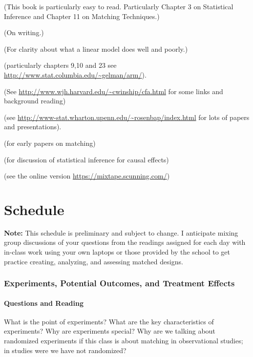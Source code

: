 \documentclass[10pt,letterpaper]{article}
\newenvironment{introstuff} {\setcounter{secnumdepth}{0}%
} {\setcounter{secnumdepth}{1}%
\restoregeometry
}
\begin{document}
\begin{introstuff}
   (This book is particularly easy to read. Particularly Chapter 3 on Statistical Inference and Chapter 11 on Matching Techniques.)

   (On writing.)


   (For clarity about what a linear model does well and poorly.)

    (particularly chapters 9,10 and 23 see \url{http://www.stat.columbia.edu/~gelman/arm/}).

   (See \url{http://www.wjh.harvard.edu/~cwinship/cfa.html} for some
  links and background reading)

   (see \url{http://www-stat.wharton.upenn.edu/~rosenbap/index.html} for lots of papers and presentations).

   (for early papers on matching)

   (for discussion of statistical inference for causal effects)

   (see the online version \url{https://mixtape.scunning.com/})

\end{introstuff}

\nopagebreak

  \part{Schedule}

  \textbf{Note: } This schedule is preliminary and subject to change. I
  anticipate mixing  group discussions of your questions from the readings
  assigned for each day with in-class work using your own laptops or those
  provided by the school to get practice creating, analyzing, and assessing
  matched designs.


\section{Experiments, Potential Outcomes, and Treatment Effects}

\subsection{Questions and Reading}

What is the point of experiments? What are the key characteristics of
experiments? Why are experiments special? Why are we talking about randomized
experiments if this class is about matching in observational studies; in
studies were we have not randomized?
\end{document}
